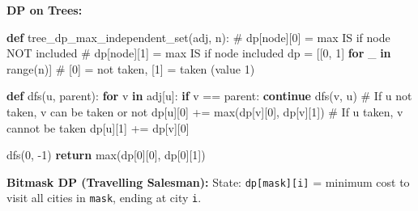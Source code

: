 \documentclass[11pt]{article}
\newenvironment{Shaded}{\begin{snugshade}}{\end{snugshade}}
\newcommand{\BuiltInTok}[1]{\textcolor[rgb]{0.50,0.55,0.55}{#1}}
\newcommand{\CommentTok}[1]{\textcolor[rgb]{0.48,0.49,0.49}{#1}}
\newcommand{\ControlFlowTok}[1]{\textcolor[rgb]{0.99,0.74,0.29}{\textbf{#1}}}
\newcommand{\DecValTok}[1]{\textcolor[rgb]{0.96,0.45,0.00}{#1}}
\newcommand{\KeywordTok}[1]{\textcolor[rgb]{0.81,0.81,0.76}{\textbf{#1}}}
\newcommand{\NormalTok}[1]{\textcolor[rgb]{0.81,0.81,0.76}{#1}}
\newcommand{\OperatorTok}[1]{\textcolor[rgb]{0.81,0.81,0.76}{#1}}
\begin{document}
\textbf{DP on Trees:}


\begin{Shaded}
\begin{Highlighting}[]
\KeywordTok{def}\NormalTok{ tree\_dp\_max\_independent\_set(adj, n):}
    \CommentTok{\# dp[node][0] = max IS if node NOT included}
    \CommentTok{\# dp[node][1] = max IS if node included}
\NormalTok{    dp }\OperatorTok{=}\NormalTok{ [[}\DecValTok{0}\NormalTok{, }\DecValTok{1}\NormalTok{] }\ControlFlowTok{for}\NormalTok{ \_ }\KeywordTok{in} \BuiltInTok{range}\NormalTok{(n)]   }\CommentTok{\# [0] = not taken, [1] = taken (value 1)}

    \KeywordTok{def}\NormalTok{ dfs(u, parent):}
        \ControlFlowTok{for}\NormalTok{ v }\KeywordTok{in}\NormalTok{ adj[u]:}
            \ControlFlowTok{if}\NormalTok{ v }\OperatorTok{==}\NormalTok{ parent: }\ControlFlowTok{continue}
\NormalTok{            dfs(v, u)}
            \CommentTok{\# If u not taken, v can be taken or not}
\NormalTok{            dp[u][}\DecValTok{0}\NormalTok{] }\OperatorTok{+=} \BuiltInTok{max}\NormalTok{(dp[v][}\DecValTok{0}\NormalTok{], dp[v][}\DecValTok{1}\NormalTok{])}
            \CommentTok{\# If u taken, v cannot be taken}
\NormalTok{            dp[u][}\DecValTok{1}\NormalTok{] }\OperatorTok{+=}\NormalTok{ dp[v][}\DecValTok{0}\NormalTok{]}

\NormalTok{    dfs(}\DecValTok{0}\NormalTok{, }\OperatorTok{{-}}\DecValTok{1}\NormalTok{)}
    \ControlFlowTok{return} \BuiltInTok{max}\NormalTok{(dp[}\DecValTok{0}\NormalTok{][}\DecValTok{0}\NormalTok{], dp[}\DecValTok{0}\NormalTok{][}\DecValTok{1}\NormalTok{])}
\end{Highlighting}
\end{Shaded}

\textbf{Bitmask DP (Travelling Salesman):}
State: \texttt{dp{[}mask{]}{[}i{]}} = minimum cost to visit all cities in \texttt{mask}, ending at city \texttt{i}.

\end{document}
